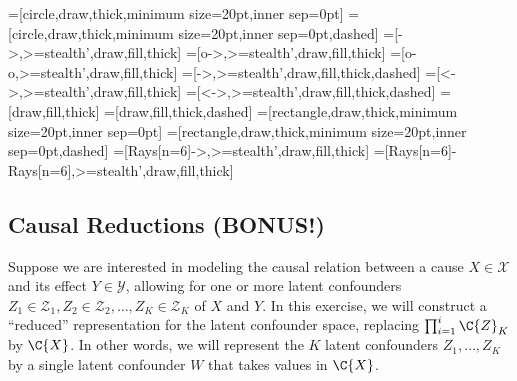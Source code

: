 =[circle,draw,thick,minimum size=20pt,inner sep=0pt]
=[circle,draw,thick,minimum size=20pt,inner sep=0pt,dashed] %
=[->,>=stealth',draw,fill,thick]
=[o->,>=stealth',draw,fill,thick]
=[o-o,>=stealth',draw,fill,thick]
=[->,>=stealth',draw,fill,thick,dashed] %
=[<->,>=stealth',draw,fill,thick]
=[<->,>=stealth',draw,fill,thick,dashed] %
=[draw,fill,thick]
=[draw,fill,thick,dashed] %
=[rectangle,draw,thick,minimum size=20pt,inner sep=0pt]
=[rectangle,draw,thick,minimum size=20pt,inner sep=0pt,dashed]
=[{Rays[n=6]}->,>=stealth',draw,fill,thick]
=[{Rays[n=6]}-{Rays[n=6]},>=stealth',draw,fill,thick]

\subsection{Causal Reductions (BONUS!)}

Suppose we are interested in modeling the causal relation between a cause $X \in \mathcal{X}$ and its effect $Y \in \mathcal{Y}$, allowing for one or more latent confounders $Z_1 \in \mathcal{Z}_1, Z_2 \in \mathcal{Z}_2, \dots, Z_K \in \mathcal{Z}_K$ of $X$ and $Y$.
In this exercise, we will construct a ``reduced'' representation for the latent confounder space, replacing $\prod_{i=1}^i \C{Z}_K$ by $\C{X}$.
In other words, we will represent the $K$ latent confounders $Z_1,\dots,Z_K$ by a single latent confounder $W$ that takes values in $\C{X}$.


